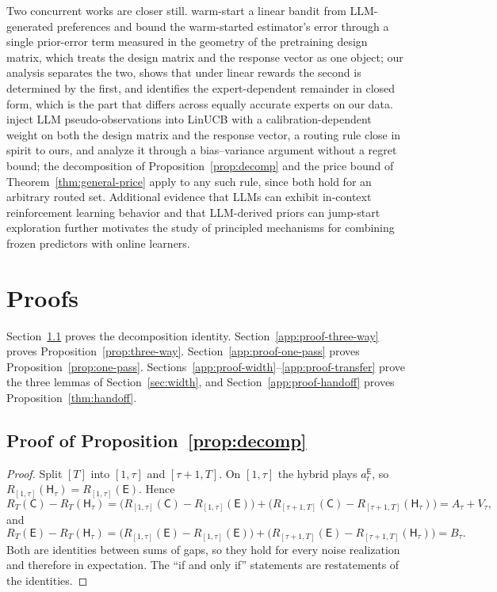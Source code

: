 \documentclass{article}
\theoremstyle{definition}
\theoremstyle{remark}
\theoremstyle{remark}
\newcommand{\Cold}{\mathsf{C}}
\newcommand{\Exp}{\mathsf{E}}
\newcommand{\Hyb}{\mathsf{H}}
\begin{document}
Two concurrent works are closer still. \cite{jumpstart2026} warm-start a linear
bandit from LLM-generated preferences and bound the warm-started estimator's
error through a single prior-error term measured in the geometry of the
pretraining design matrix, which treats the design matrix and the response
vector as one object; our analysis separates the two, shows that under linear
rewards the second is determined by the first, and identifies the
expert-dependent remainder in closed form, which is the part that differs
across equally accurate experts on our data. \cite{calibgated2026} inject LLM
pseudo-observations into LinUCB with a calibration-dependent weight on both the
design matrix and the response vector, a routing rule close in spirit to ours,
and analyze it through a bias--variance argument without a regret bound; the
decomposition of Proposition~\ref{prop:decomp} and the price bound of
Theorem~\ref{thm:general-price} apply to any such rule, since both hold for an
arbitrary routed set. Additional evidence that LLMs can
exhibit in-context reinforcement learning behavior
\cite{monea2024llms,krishnamurthy2024can} and that LLM-derived priors can
jump-start exploration \cite{alamdari2024jumpstarting,abbasiyadkori2024believe}
further motivates the study of principled mechanisms for combining frozen
predictors with online learners.


\section{Proofs}
\label{app:proofs}

Section~\ref{app:proof-decomp} proves the decomposition identity.
Section~\ref{app:proof-three-way} proves
Proposition~\ref{prop:three-way}.
Section~\ref{app:proof-one-pass} proves Proposition~\ref{prop:one-pass}.
Sections~\ref{app:proof-width}--\ref{app:proof-transfer} prove the three
lemmas of Section~\ref{sec:width}, and Section~\ref{app:proof-handoff}
proves Proposition~\ref{thm:handoff}.

\subsection{Proof of Proposition~\ref{prop:decomp}}
\label{app:proof-decomp}

\begin{proof}
Split $[T]$ into $[1,\tau]$ and $[\tau+1,T]$. On $[1,\tau]$ the hybrid plays
$a_t^{\Exp}$, so $R_{[1,\tau]}(\Hyb_\tau)=R_{[1,\tau]}(\Exp)$. Hence
\[
R_T(\Cold)-R_T(\Hyb_\tau)
=\bigl(R_{[1,\tau]}(\Cold)-R_{[1,\tau]}(\Exp)\bigr)
+\bigl(R_{[\tau+1,T]}(\Cold)-R_{[\tau+1,T]}(\Hyb_\tau)\bigr)
=A_\tau+V_\tau ,
\]
and
\[
R_T(\Exp)-R_T(\Hyb_\tau)
=\bigl(R_{[1,\tau]}(\Exp)-R_{[1,\tau]}(\Exp)\bigr)
+\bigl(R_{[\tau+1,T]}(\Exp)-R_{[\tau+1,T]}(\Hyb_\tau)\bigr)
=B_\tau .
\]
Both are identities between sums of gaps, so they hold for every noise
realization and therefore in expectation. The ``if and only if'' statements
are restatements of the identities.
\end{proof}
\end{document}
